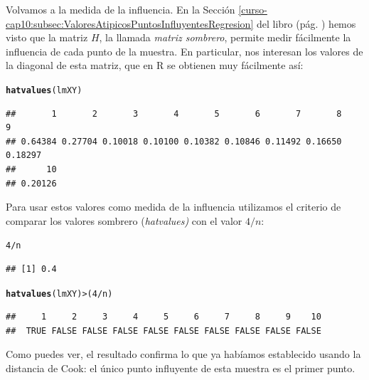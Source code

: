 \documentclass[10pt,a4paper]{article}\usepackage[]{graphicx}\usepackage[]{color}
\makeatletter
\newcommand{\hlnum}[1]{\textcolor[rgb]{0.686,0.059,0.569}{#1}}%
\newcommand{\hlopt}[1]{\textcolor[rgb]{0,0,0}{#1}}%
\newcommand{\hlstd}[1]{\textcolor[rgb]{0.345,0.345,0.345}{#1}}%
\newcommand{\hlkwd}[1]{\textcolor[rgb]{0.737,0.353,0.396}{\textbf{#1}}}%
\newenvironment{kframe}{%
 \def\at@end@of@kframe{}%
 \ifinner\ifhmode%
  \def\at@end@of@kframe{\end{minipage}}%
  \begin{minipage}{\columnwidth}%
 \fi\fi%
 \def\FrameCommand##1{\hskip\@totalleftmargin \hskip-\fboxsep
 \colorbox{shadecolor}{##1}\hskip-\fboxsep
     \hskip-\linewidth \hskip-\@totalleftmargin \hskip\columnwidth}%
 \MakeFramed {\advance\hsize-\width
   \@totalleftmargin\z@ \linewidth\hsize
   \@setminipage}}%
 {\par\unskip\endMakeFramed%
 \at@end@of@kframe}
\newenvironment{knitrout}{}{} %
\makeatother
\begin{document}
Volvamos a la medida de la influencia. En la Sección \ref{curso-cap10:subsec:ValoresAtipicosPuntosInfluyentesRegresion} del libro (pág. \pageref{curso-cap10:subsec:ValoresAtipicosPuntosInfluyentesRegresion}) hemos visto que la matriz $H$, la llamada {\em matriz sombrero}, permite medir fácilmente la influencia de cada punto de la muestra. En particular, nos interesan los valores de la diagonal de esta matriz, que en R se obtienen muy fácilmente así:
\begin{knitrout}
\color{fgcolor}\begin{kframe}
\begin{alltt}
\hlkwd{hatvalues}\hlstd{(lmXY)}
\end{alltt}
\begin{verbatim}
##       1       2       3       4       5       6       7       8       9 
## 0.64384 0.27704 0.10018 0.10100 0.10382 0.10846 0.11492 0.16650 0.18297 
##      10 
## 0.20126
\end{verbatim}
\end{kframe}
\end{knitrout}
Para usar estos valores como medida de la influencia utilizamos el  criterio de comparar los valores sombrero {(\em hatvalues)} con el valor $4/n$:
\begin{knitrout}
\color{fgcolor}\begin{kframe}
\begin{alltt}
\hlnum{4}\hlopt{/}\hlstd{n}
\end{alltt}
\begin{verbatim}
## [1] 0.4
\end{verbatim}
\begin{alltt}
\hlkwd{hatvalues}\hlstd{(lmXY)} \hlopt{>} \hlstd{(}\hlnum{4} \hlopt{/} \hlstd{n)}
\end{alltt}
\begin{verbatim}
##     1     2     3     4     5     6     7     8     9    10 
##  TRUE FALSE FALSE FALSE FALSE FALSE FALSE FALSE FALSE FALSE
\end{verbatim}
\end{kframe}
\end{knitrout}
Como puedes ver, el resultado confirma lo que ya habíamos establecido usando la distancia de Cook: el único punto influyente de esta muestra es el primer punto.
\end{document}

